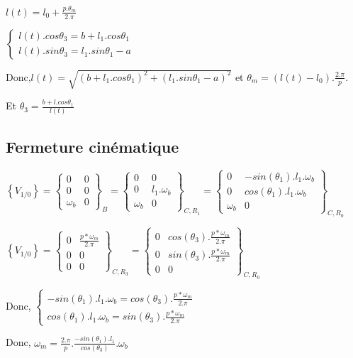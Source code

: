 $l(t)=l_0+\frac{p.\theta_m}{2.\pi}$

$\left\{\begin{array}{l}
l(t).cos\theta_3=b+l_1.cos\theta_1 \\
l(t).sin\theta_3=l_1.sin\theta_1-a
\end{array}\right.$

Donc,$l(t)=\sqrt{(b+l_1.cos\theta_1)^2+(l_1.sin\theta_1-a)^2}$ et $\theta_m=(l(t)-l_0).\frac{2.\pi}{p}$.

Et $\theta_3=\frac{b+l.cos\theta_1}{l(t)}$

\subsection{Fermeture cinématique}

$\left\{V_{1/0}\right\}=
\left\{\begin{array}{cc}
0 & 0\\
0 & 0\\
\omega_b & 0
\end{array}
\right\}_B=
\left\{
\begin{array}{cc}
0 & 0\\
0 & l_1.\omega_b\\
\omega_b & 0
\end{array}
\right\}_{C,R_1}=
\left\{
\begin{array}{cc}
0 & -sin(\theta_1).l_1.\omega_b\\
0 & cos(\theta_1).l_1.\omega_b\\
\omega_b & 0
\end{array}
\right\}_{C,R_0}$

$\left\{V_{1/0}\right\}=
\left\{
\begin{array}{cc}
0 & \frac{p*\omega_m}{2.\pi}\\
0 & 0\\
0 & 0
\end{array}
\right\}_{C,R_3}=
\left\{
\begin{array}{cc}
0 & cos(\theta_3).\frac{p*\omega_m}{2.\pi}\\
0 & sin(\theta_3).\frac{p*\omega_m}{2.\pi}\\
0 & 0
\end{array}
\right\}_{C,R_0}$

Donc, 
$\left\{
\begin{array}{l}
-sin(\theta_1).l_1.\omega_b=cos(\theta_3).\frac{p*\omega_m}{2.\pi}\\
cos(\theta_1).l_1.\omega_b=sin(\theta_3).\frac{p*\omega_m}{2.\pi}
\end{array}\right.$

Donc, $\omega_m=\frac{2.\pi}{p}.\frac{-sin(\theta_1).l_1}{cos(\theta_3)}.\omega_b$



